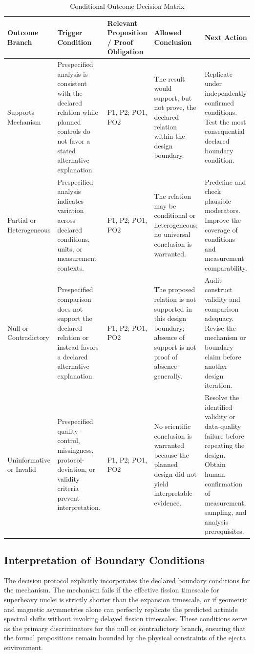 \documentclass[conference]{IEEEtran}
\begin{document}
\begin{table}[htbp]
\centering
\footnotesize
\setlength{\tabcolsep}{3pt}
\renewcommand{\arraystretch}{1.12}
\caption{Conditional Outcome Decision Matrix}
\label{tab:expected-outcomes-block-2}
\begin{tabular}{|p{}|p{}|p{}|p{}|p{}|}
\hline
Outcome Branch & Trigger Condition & Relevant Proposition / Proof Obligation & Allowed Conclusion & Next Action \\\hline
Supports Mechanism & Prespecified analysis is consistent with the declared relation while planned controls do not favor a stated alternative explanation. & P1, P2; PO1, PO2 & The result would support, but not prove, the declared relation within the design boundary. & Replicate under independently confirmed conditions. Test the most consequential declared boundary condition. \\\hline
Partial or Heterogeneous & Prespecified analysis indicates variation across declared conditions, units, or measurement contexts. & P1, P2; PO1, PO2 & The relation may be conditional or heterogeneous; no universal conclusion is warranted. & Predefine and check plausible moderators. Improve the coverage of conditions and measurement comparability. \\\hline
Null or Contradictory & Prespecified comparison does not support the declared relation or instead favors a declared alternative explanation. & P1, P2; PO1, PO2 & The proposed relation is not supported in this design boundary; absence of support is not proof of absence generally. & Audit construct validity and comparison adequacy. Revise the mechanism or boundary claim before another design iteration. \\\hline
Uninformative or Invalid & Prespecified quality-control, missingness, protocol-deviation, or validity criteria prevent interpretation. & P1, P2; PO1, PO2 & No scientific conclusion is warranted because the planned design did not yield interpretable evidence. & Resolve the identified validity or data-quality failure before repeating the design. Obtain human confirmation of measurement, sampling, and analysis prerequisites. \\\hline
\end{tabular}
\end{table}

\subsection{Interpretation of Boundary Conditions}
The decision protocol explicitly incorporates the declared boundary conditions for the mechanism. The mechanism fails if the effective fission timescale for superheavy nuclei is strictly shorter than the expansion timescale, or if geometric and magnetic asymmetries alone can perfectly replicate the predicted actinide spectral shifts without invoking delayed fission timescales. These conditions serve as the primary discriminators for the null or contradictory branch, ensuring that the formal propositions remain bounded by the physical constraints of the ejecta environment.
\end{document}
